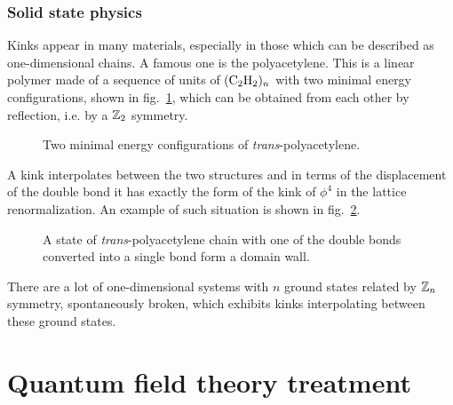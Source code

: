 \documentclass[../main/main.tex]{subfiles}
\begin{document}
\subsubsection{Solid state physics}

Kinks appear in many materials, especially in those which can be described as one-dimensional chains. A famous one is the polyacetylene. This is a linear polymer made of a sequence of units of $(\text C_2\text H_2)_n$ with two minimal energy configurations, shown in fig.~\ref{fig:polyacetylene}, which can be obtained from each other by reflection, i.e. by a $\mathbb{Z}_2$ symmetry.

\begin{figure}[h]
	\centering
	\quad
	\caption{Two minimal energy configurations of \emph{trans}-polyacetylene.}
	\label{fig:polyacetylene}
\end{figure}

A kink interpolates between the two structures and in terms of the displacement of the double bond it has exactly the form of the kink of $\phi^4$ in the lattice renormalization. An example of such situation is shown in fig.~\ref{fig:kink-polyacetylene}.

\begin{figure}[h]
	\centering
	\caption{A state of \emph{trans}-polyacetylene chain with one of the double bonds\\converted into a single bond form a domain wall.}
	\label{fig:kink-polyacetylene}
\end{figure}

There are a lot of one-dimensional systems with $n$ ground states related by $\mathbb{Z}_n$ symmetry, spontaneously broken, which exhibits kinks interpolating between these ground states. 

\section{Quantum field theory treatment}\label{sec:qft-kink}
\end{document}
